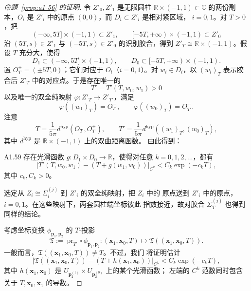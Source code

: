 \begin{proof}[命题~\ref{prop:a1-56} 的证明]
令 $Z'_0,Z'_1$ 是无限圆柱
$\mathbb R\times(-1,1)\subset\mathbb C$ 的两份副本，$O_i$ 是
$Z'_i$ 中的原点 $(0,0)$，而 $D_i\subset Z'_i$ 是相对紧区域，
$i=0,1$。对 $T>0$，把
\[
 (-\infty,5T]\times(-1,1)\subset Z'_1,
 \qquad
 [-5T,+\infty)\times(-1,1)\subset Z'_0
\]
沿 $(5T,s)\in Z'_1$ 与 $(-5T,s)\in Z'_0$ 的识别胶合，得到
$Z'_T\cong\mathbb R\times(-1,1)$。假设 $T$ 充分大，使得
\[
 D_1\subset(-\infty,5T]\times(-1,1),\qquad
 D_0\subset[-5T,+\infty)\times(-1,1).
\]
置 $O_T^\pm=(\pm5T,0)$；它们对应于 $O_i$（$i=0,1$）。对
$w_i\in D_i$，以 $(w_i)_T$ 表示胶合后 $Z'_T$ 中的对应点。于是存在唯一的
\[
 T'=T'(T,w_0,w_1)>0
\]
以及唯一的双全纯映射 $\varphi\colon Z'_T\to Z'_{T'}$，满足
\[
 \varphi((w_1)_T)=O_{T'}^-,\qquad
 \varphi((w_0)_T)=O_{T'}^+.
\]
注意
\[
 T=\frac1{5\pi}d^{\mathrm{hyp}}(O_T^-,O_T^+),
 \qquad
 T'=\frac1{5\pi}d^{\mathrm{hyp}}((w_1)_T,(w_0)_T),
\]
其中 $d^{\mathrm{hyp}}$ 是 $\mathbb R\times(-1,1)$ 上的双曲距离函数。
由此得到：

\begin{lemma}{A1.59}\label{lem:a1-59}
存在光滑函数 $g\colon D_1\times D_0\to\mathbb R$，使得对任意
$k=0,1,2,\ldots$，都有
\[
 \bigl\lvert
 T'(T,w_0,w_1)-(T+g(w_1,w_0))
 \bigr\rvert_{C^k}
 <C_k\exp(-c_kT),
\]
其中 $c_k,C_k>0$。
\end{lemma}

选定从 $Z_i\cong\Sigma_i^{(j)}$ 到 $Z'_i$ 的双全纯映射，把 $Z_i$ 中的
原点送到 $Z'_i$ 中的原点，$i=0,1$。在这些映射下，两套圆柱端坐标彼此
指数接近，故对胶合 $\Sigma_T^{(j)}$ 也得到同样的结论。

考虑坐标变换 $\phi_{\mathbf p_1,\mathbf p_2}$ 的 $T$-投影
\[
 \mathfrak T:=\operatorname{pr}_T\circ
 \phi_{\mathbf p_1,\mathbf p_2}\colon
 (\mathbf x_1,\mathbf x_0,T)
 \longmapsto\mathfrak T((\mathbf x_1,\mathbf x_0,T)).
\]
一般而言，$\mathfrak T((\mathbf x_1,\mathbf x_0,T))\ne T$。不过，我们
将证明估计
\begin{equation}
 \left\lvert
 \mathfrak T((\mathbf x_1,\mathbf x_0,T))
 -(T+h(\mathbf x_1,\mathbf x_0))
 \right\rvert_{C^k}
 <C_k\exp(-c_kT),
\tag{A1.60.1}\label{eq:a1-60-1}
\end{equation}
其中 $h(\mathbf x_1,\mathbf x_0)$ 是
$U_{\mathbf p_2^{(1)}}\times U_{\mathbf p_2^{(0)}}$ 上的某个光滑函数；
左端的 $C^k$ 范数同时包含关于 $T,\mathbf x_0,\mathbf x_1$ 的导数。


\end{proof}
